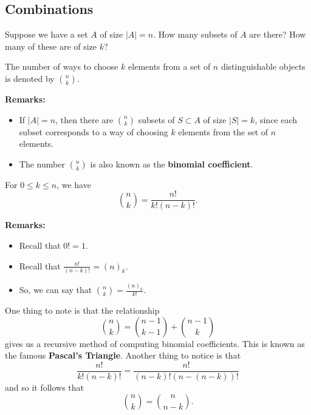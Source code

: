 \subsection{Combinations}
Suppose we have a set $A$ of size $|A| = n$. How many subsets of $A$ are there? How many of these are of size $k$? 

\begin{definition}{}{}
    The number of ways to choose $k$ elements from a set of $n$ distinguishable objects is denoted by $\binom{n}{k}$.
\end{definition}
\textbf{Remarks:}
\begin{itemize}
    \item If $|A| = n$, then there are $\binom{n}{k}$ subsets of $S \subset A$ of size $|S| = k$, since each subset corresponds to a way of choosing $k$ elements from the set of $n$ elements. 
    \item The number $\binom{n}{k}$ is also known as the \textbf{binomial coefficient}.
\end{itemize}

\begin{theorem}{}{}
    For $0 \leq k \leq n$, we have 
    \[\binom{n}{k} = \frac{n!}{k!(n - k)!}.\]
\end{theorem}
\textbf{Remarks:}
\begin{itemize}
    \item Recall that $0! = 1$.
    \item Recall that $\frac{n!}{(n - k)!} = (n)_k$. 
    \item So, we can say that $\binom{n}{k} = \frac{(n)_k}{k!}$.
\end{itemize}
One thing to note is that the relationship 
\[\binom{n}{k} = \binom{n - 1}{k - 1} + \binom{n - 1}{k}\]
gives us a recursive method of computing binomial coefficients. This is known as the famous \textbf{Pascal's Triangle}.
Another thing to notice is that 
\[\frac{n!}{k!(n - k)!} = \frac{n!}{(n - k)!(n - (n - k))!}\]
and so it follows that 
\[\binom{n}{k} = \binom{n}{n - k}.\]

